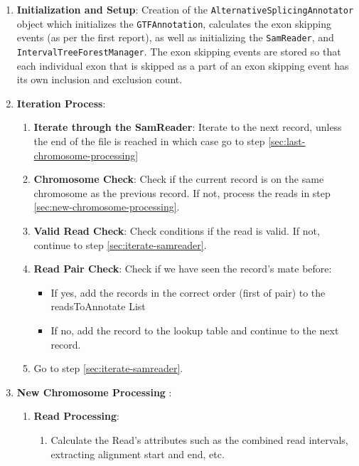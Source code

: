 \documentclass{article}
\begin{document}
    \begin{enumerate}
        \item \textbf{Initialization and Setup}: Creation of the \texttt{AlternativeSplicingAnnotator} object which initializes the \texttt{GTFAnnotation}, calculates the exon skipping events (as per the first report), as well as initializing the \texttt{SamReader}, and \texttt{IntervalTreeForestManager}. The exon skipping events are stored so that each individual exon that is skipped as a part of an exon skipping event has its own inclusion and exclusion count.
        \item \textbf{Iteration Process}:
        \begin{enumerate}
            \item \textbf{Iterate through the SamReader}: Iterate to the next record, unless the end of the file is reached in which case go to step \ref{sec:last-chromosome-processing} \label{sec:iterate-samreader}
            \item \textbf{Chromosome Check}: Check if the current record is on the same chromosome as the previous record. If not, process the reads in step \ref{sec:new-chromosome-processing}. \label{sec:chromosome-check}
            \item \textbf{Valid Read Check}: Check conditions if the read is valid. If not, continue to step \ref{sec:iterate-samreader}.
            \item \textbf{Read Pair Check}: Check if we have seen the record's mate before:
            \begin{itemize}
                \item If yes, add the records in the correct order (first of pair) to the readsToAnnotate List
                \item If no, add the record to the lookup table and continue to the next record.
            \end{itemize}
            \item Go to step \ref{sec:iterate-samreader}.
        \end{enumerate}
        \item \textbf{New Chromosome Processing} \label{sec:new-chromosome-processing}:
        \begin{enumerate}
            \item \textbf{Read Processing}: \label{sec:read-processing}
            \begin{enumerate}
                \item Calculate the Read's attributes such as the combined read intervals, extracting alignment start and end, etc.

\end{enumerate}
\end{enumerate}
\end{enumerate}
\end{document}
